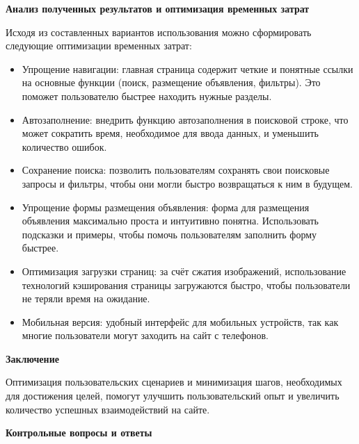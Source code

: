 \textbf{Анализ полученных результатов и оптимизация временных затрат}

Исходя из составленных вариантов использования можно сформировать следующие оптимизации временных затрат:

\begin{itemize}
    \item Упрощение навигации: главная страница содержит четкие и понятные ссылки на основные функции (поиск, размещение объявления, фильтры). Это поможет пользователю быстрее находить нужные разделы.
    \item Автозаполнение: внедрить функцию автозаполнения в поисковой строке, что может сократить время, необходимое для ввода данных, и уменьшить количество ошибок.
    \item Сохранение поиска: позволить пользователям сохранять свои поисковые запросы и фильтры, чтобы они могли быстро возвращаться к ним в будущем.
    \item Упрощение формы размещения объявления: форма для размещения объявления максимально проста и интуитивно понятна. Использовать подсказки и примеры, чтобы помочь пользователям заполнить форму быстрее.
    \item Оптимизация загрузки страниц: за счёт сжатия изображений, использование технологий кэширования страницы загружаются быстро, чтобы пользователи не теряли время на ожидание.
    \item Мобильная версия: удобный интерфейс для мобильных устройств, так как многие пользователи могут заходить на сайт с телефонов.
\end{itemize}
\bigskip

\textbf{Заключение}

Оптимизация пользовательских сценариев и минимизация шагов, необходимых для достижения целей, помогут улучшить пользовательский опыт и увеличить количество успешных взаимодействий на сайте.
\bigskip

\textbf{Контрольные вопросы и ответы}

